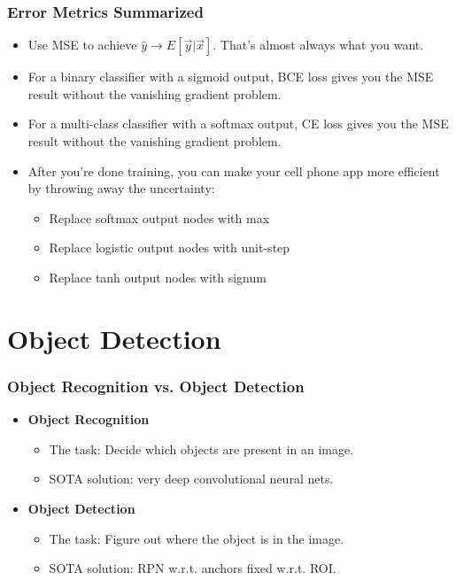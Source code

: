 \documentclass{beamer}
\begin{document}
\begin{frame}
  \frametitle{Error Metrics Summarized}
  \begin{itemize}
    \item Use MSE to achieve $\hat{y}\rightarrow
      E\left[\vec{y}|\vec{x}\right]$.  That's almost always what you
      want.
    \item For a binary classifier with a sigmoid output, BCE loss gives you
      the MSE result without the vanishing gradient problem.
    \item For a multi-class classifier with a softmax output, CE loss gives you
      the MSE result without the vanishing gradient problem.
    \item After you're done training, you can make your cell phone app
      more efficient by throwing away the uncertainty:
      \begin{itemize}
      \item Replace softmax output nodes with max
      \item Replace logistic output nodes with unit-step
      \item Replace tanh output nodes with signum
      \end{itemize}
  \end{itemize}
\end{frame}

\section{Object Detection}
\setcounter{subsection}{1}

\begin{frame}
  \frametitle{Object Recognition vs. Object Detection}
  \begin{itemize}
  \item {\bf Object Recognition}
    \begin{itemize}
    \item The task: Decide which objects are present in an image.
    \item SOTA solution: very deep convolutional neural nets.
    \end{itemize}
  \item {\bf Object Detection}
    \begin{itemize}
    \item The task: Figure out where the object is in the image.
    \item SOTA solution: RPN w.r.t. anchors fixed w.r.t. ROI.
    \end{itemize}
  \end{itemize}
\end{frame}
\end{document}

